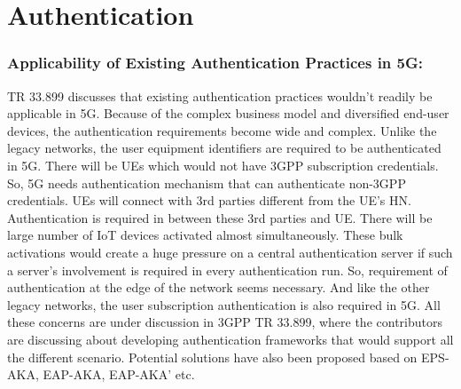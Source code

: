 \documentclass[lnicst,sechang,a4paper]{svmultln}
\begin{document}
\section{Authentication}
\label{sec:authentication}

\subsubsection{Applicability of Existing Authentication Practices in 5G:}
TR 33.899 discusses that existing authentication practices wouldn't readily be applicable in 5G. Because of the complex business model and diversified end-user devices, the authentication requirements become wide and complex. Unlike the legacy networks, the user equipment identifiers are required to be authenticated in 5G. There will be UEs which would not have 3GPP subscription credentials. So, 5G needs authentication mechanism that can authenticate non-3GPP credentials. UEs will connect with 3rd parties different from the UE's HN. Authentication is required in between these 3rd parties and UE. There will be large number of IoT devices activated almost simultaneously. These bulk activations would create a huge pressure on a central authentication server if such a server's involvement is required in every authentication run. So, requirement of authentication at the edge of the network seems necessary. And like the other legacy networks, the user subscription authentication is also required in 5G. All these concerns are under discussion in 3GPP TR 33.899, where the contributors are discussing about developing authentication frameworks that would support all the different scenario. Potential solutions have also been proposed based on EPS-AKA, EAP-AKA, EAP-AKA' etc.
\end{document}

